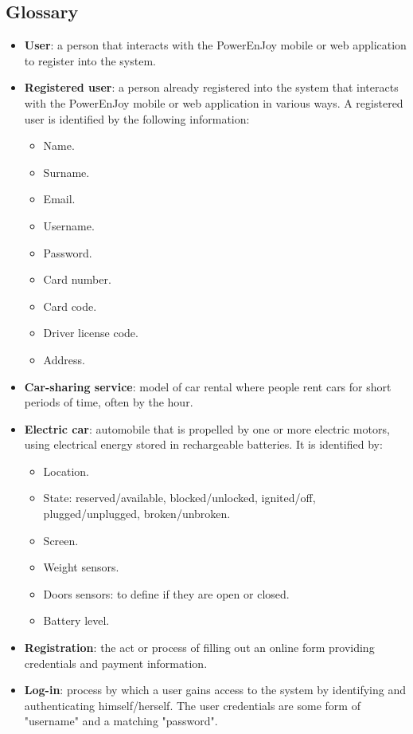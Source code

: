 \subsection{Glossary}
\begin{itemize}
	\item \textbf{User}: a person that interacts with the PowerEnJoy mobile or web application to register into the system.
	\item \textbf{Registered user}: a person already registered into the system that interacts with the PowerEnJoy mobile or web application in various ways. A registered user is identified by the following information:
	\begin{itemize}
		\item Name.
		\item Surname.
		\item Email.
		\item Username.
		\item Password.
		\item Card number.
		\item Card code.
		\item Driver license code.
		\item Address.
	\end{itemize}
	\item \textbf{Car-sharing service}: model of car rental where people rent cars for short periods of time, often by the hour.
	\item \textbf{Electric car}: automobile that is propelled by one or more electric motors, using electrical energy stored in rechargeable batteries. It is identified by:
	\begin{itemize}
		\item Location.
		\item State: reserved/available, blocked/unlocked, ignited/off, plugged/unplugged, broken/unbroken.
		\item Screen.
		\item Weight sensors.
		\item Doors sensors: to define if they are open or closed.
		\item Battery level. 
	\end{itemize}
	\item \textbf{Registration}: the act or process of filling out an online form providing credentials and payment information. 
	\item \textbf{Log-in}: process by which a user gains access to the system by identifying and authenticating himself/herself. The user credentials are some form of "username" and a matching "password".

\end{itemize}
